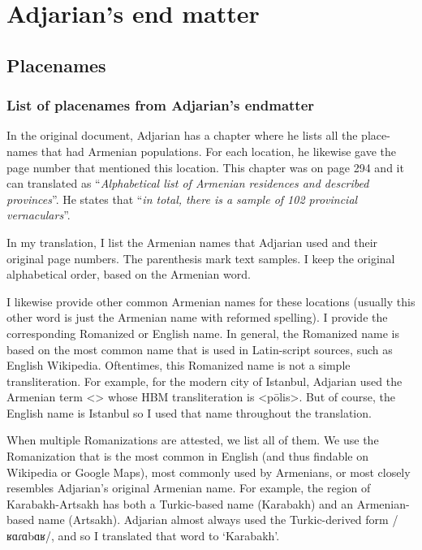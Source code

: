 \part{Adjarian's end matter}
\chapter{Placenames     }


\section{List of placenames from Adjarian's endmatter}
In the original document, Adjarian has a chapter where he lists all the place-names that had Armenian populations. For each location, he likewise gave the page number that mentioned this location.  This chapter was on page   294 and it can translated as ``\textit{Alphabetical list of Armenian residences and described provinces}''. He states that ``\textit{in total, there is a sample of 102 provincial vernaculars}''. 

In my translation, I list the Armenian names that Adjarian used and their original page numbers. The parenthesis mark text samples. I keep the original alphabetical order, based on the Armenian word.

I likewise provide other common Armenian names for these locations (usually this other word is just the Armenian name with reformed spelling). I provide  the corresponding Romanized or English name. In general, the Romanized name is based on the most common name that is used in Latin-script sources, such as English Wikipedia. Oftentimes, this Romanized name is not a simple transliteration. For example, for the modern city of Istanbul, Adjarian used the Armenian term  <> whose HBM transliteration is <pōlis>. But of course, the English name is Istanbul so I used that name throughout the translation. 

When multiple Romanizations are attested, we list all of them. We use the Romanization that is the most common in English (and thus findable on Wikipedia or Google Maps), most commonly used by Armenians, or most closely resembles Adjarian's original Armenian name. For example, the region of Karabakh-Artsakh has both a Turkic-based name (Karabakh) and an Armenian-based name (Artsakh). Adjarian almost always used the Turkic-derived form  /ʁɑɾɑbɑʁ/, and so I translated that word to `Karabakh'. 

